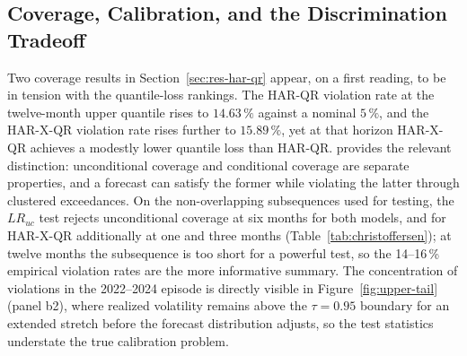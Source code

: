 \subsection{Coverage, Calibration, and the Discrimination Tradeoff}
\label{sec:disc-coverage}

Two coverage results in Section~\ref{sec:res-har-qr} appear, on a first
reading, to be in tension with the quantile-loss rankings. The HAR-QR
violation rate at the twelve-month upper quantile rises to $14.63\,\%$
against a nominal $5\,\%$, and the HAR-X-QR violation rate rises further to
$15.89\,\%$, yet at that horizon HAR-X-QR achieves a modestly lower quantile
loss than HAR-QR. \textcite{christoffersen1998evaluating} provides the relevant
distinction: unconditional coverage and conditional coverage are separate
properties, and a forecast can satisfy the former while violating the
latter through clustered exceedances. On the non-overlapping subsequences
used for testing, the $LR_{uc}$ test rejects unconditional coverage at six
months for both models, and for HAR-X-QR additionally at one and three
months (Table~\ref{tab:christoffersen}); at twelve months the subsequence
is too short for a powerful test, so the 14--16\,\% empirical violation
rates are the more informative summary. The concentration of violations in
the 2022--2024 episode is directly visible in
Figure~\ref{fig:upper-tail} (panel b2), where realized volatility remains
above the $\tau = 0.95$ boundary for an extended stretch before the
forecast distribution adjusts, so the test statistics understate the true
calibration problem.

